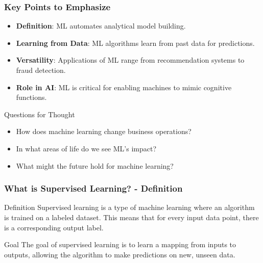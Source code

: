 \documentclass[aspectratio=169]{beamer}
\begin{document}
\begin{frame}[fragile]
    \frametitle{Key Points to Emphasize}
    \begin{itemize}
        \item \textbf{Definition}: ML automates analytical model building.
        \item \textbf{Learning from Data}: ML algorithms learn from past data for predictions.
        \item \textbf{Versatility}: Applications of ML range from recommendation systems to fraud detection.
        \item \textbf{Role in AI}: ML is critical for enabling machines to mimic cognitive functions.
    \end{itemize}
    \begin{block}{Questions for Thought}
        \begin{itemize}
            \item How does machine learning change business operations?
            \item In what areas of life do we see ML's impact?
            \item What might the future hold for machine learning?
        \end{itemize}
    \end{block}
\end{frame}

\begin{frame}[fragile]
    \frametitle{What is Supervised Learning? - Definition}
    \begin{block}{Definition}
        Supervised learning is a type of machine learning where an algorithm is trained on a labeled dataset. This means that for every input data point, there is a corresponding output label.
    \end{block}
    \begin{block}{Goal}
        The goal of supervised learning is to learn a mapping from inputs to outputs, allowing the algorithm to make predictions on new, unseen data.
    \end{block}
\end{frame}
\end{document}
